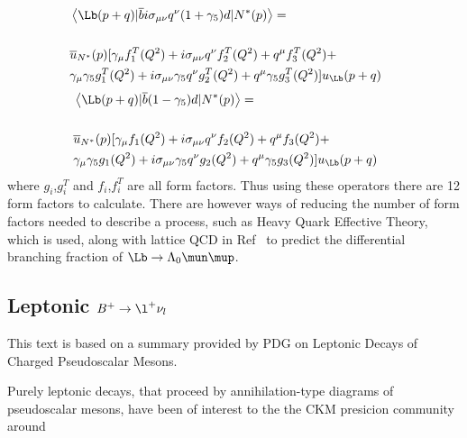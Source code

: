 \begin{equation}
\hspace*{-0.5cm}
\begin{split}
&\left<\Lb(p+q)|\overline{b}i\sigma_{\mu\nu}q^{\nu}(1+\gamma_{5})d|N^{*}(p)\right> = \\&\\&\overline{u}_{N^{*}}(p)[\gamma_{\mu}f^{T}_{1}(Q^{2}) + i\sigma_{\mu\nu}q^{\nu}f^{T}_{2}(Q^{2}) + q^{\mu}f^{T}_{3}(Q^{2}) + \\
&\gamma_{\mu}\gamma_{5}g^{T}_{1}(Q^{2}) + i\sigma_{\mu\nu}\gamma_{5}q^{\nu}g^{T}_{2}(Q^{2}) + q^{\mu}\gamma_{5}g^{T}_{3}(Q^{2})]u_{\Lb}(p+q)
\end{split}
\end{equation}
\begin{equation}
\hspace*{-0.5cm}
\begin{split}
&\left<\Lb(p+q)|\overline{b}(1-\gamma_{5})d|N^{*}(p)\right> = \\&\\&\overline{u}_{N^{*}}(p)[\gamma_{\mu}f_{1}(Q^{2}) + i\sigma_{\mu\nu}q^{\nu}f_{2}(Q^{2}) + q^{\mu}f_{3}(Q^{2}) + \\
&\gamma_{\mu}\gamma_{5}g_{1}(Q^{2}) + i\sigma_{\mu\nu}\gamma_{5}q^{\nu}g_{2}(Q^{2}) + q^{\mu}\gamma_{5}g_{3}(Q^{2})]u_{\Lb}(p+q)\\
\end{split}
\end{equation}
where $g_{i}$,$g^{T}_{i}$ and $f_{i}$,$f^{T}_{i}$ are all form factors. Thus using these operators there are 12 form factors to calculate. There are however ways of reducing the number of form factors needed to describe a process, such as Heavy Quark Effective Theory, which is used, along with lattice QCD in Ref~\cite{Meinel} to predict the differential branching fraction of $\Lb\to\Lambda_{0}\mun\mup$.

\subsection{Leptonic $B^{+}\rightarrow \l^{+} \nu_{l}$}
This text is based on a summary provided by PDG on Leptonic Decays of Charged Pseudoscalar Mesons.


Purely leptonic decays, that proceed by annihilation-type diagrams of pseudoscalar mesons, have been of interest to the the CKM presicion community around



